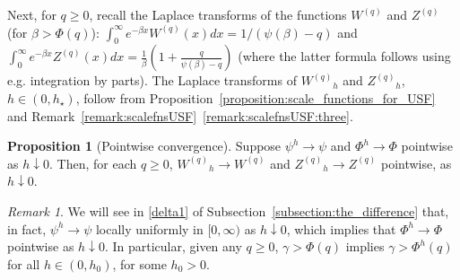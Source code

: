 \documentclass[pdftex,oneside,11pt,reqno]{amsart}
\theoremstyle{definition}
\theoremstyle{theorem}
\newtheorem{proposition}{Proposition}[section]
\theoremstyle{remark}
\newtheorem{remark}{Remark}[section]
\numberwithin{equation}{section}
\numberwithin{definition}{section}
\begin{document}
Next, for $q\geq 0$, recall the Laplace transforms of the functions ${W^{(q)}}$ and ${Z^{(q)}}$ \cite[p. 214, Theorem~8.1]{kyprianou} (for $\beta>\Phi(q)$): $\int_0^\infty e^{-\beta x}{W^{(q)}}(x)dx=1/(\psi(\beta)-q)$ and $\int_0^\infty e^{-\beta x}{Z^{(q)}}(x)dx=\frac{1}{\beta}\left(1+\frac{q}{\psi(\beta)-q}\right)$ (where the latter formula follows using e.g. integration by parts). The Laplace transforms of ${W^{(q)}}_h$ and ${Z^{(q)}}_h$, $h\in (0,h_\star)$, follow from Proposition~\ref{proposition:scale_functions_for_USF} and Remark~\ref{remark:scalefnsUSF}~\ref{remark:scalefnsUSF:three}. 

\begin{proposition}[Pointwise convergence]\label{remark:pointwise_convergence}\label{proposition:scales:pointwise_convergence}
Suppose $\psi^h\to \psi$ and $\Phi^h\to\Phi$ pointwise as $h\downarrow 0$. Then, for each $q\geq 0$, ${W^{(q)}}_{h}\to {W^{(q)}}$ and ${Z^{(q)}}_{h}\to {Z^{(q)}}$ pointwise, as $h\downarrow 0$. 
\end{proposition}
\begin{remark}\label{remark:convergencePhi}
We will see in \ref{delta1} of Subsection~\ref{subsection:the_difference} that, in fact, $\psi^h\to \psi$ locally uniformly in $[0,\infty)$ as $h\downarrow 0$, which implies that $\Phi^h\to\Phi$ pointwise as $h\downarrow 0$. In particular, given any $q\geq 0$, $\gamma>\Phi(q)$ implies $\gamma>\Phi^h(q)$ for all $h\in (0,h_0)$, for some $h_0>0$.
\end{remark}
\end{document}
